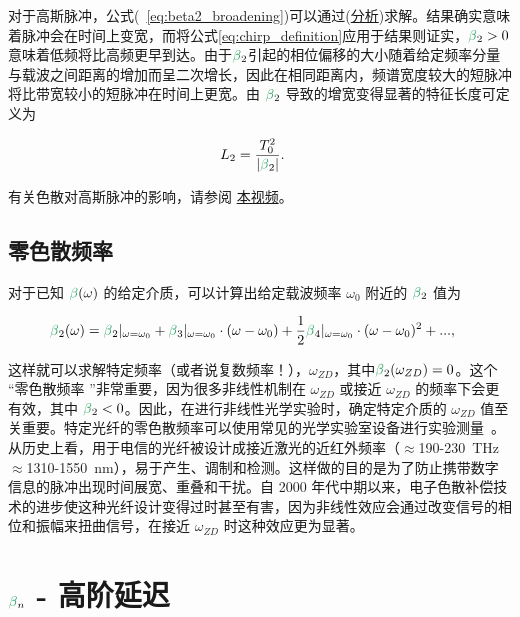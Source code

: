对于高斯脉冲，公式(~\ref{eq:beta2_broadening})可以通过(\href{https://drive.google.com/file/d/17Ab3bg0Hx0x8J-5lR29ejFg0eOlv6Psh/view?usp=sharing}{分析})求解。结果确实意味着脉冲会在时间上变宽，而将公式\ref{eq:chirp_definition}应用于结果则证实，$\betag_2>0$ 意味着低频将比高频更早到达。由于$\betag_2$引起的相位偏移的大小随着给定频率分量与载波之间距离的增加而呈二次增长，因此在相同距离内，频谱宽度较大的短脉冲将比带宽较小的短脉冲在时间上更宽。由 $\betag_2$ 导致的增宽变得显著的特征长度可定义为

\begin{align}
    \label{eq:Dispersion_length}
    L_{2} &= \frac{T_0^2}{|\betag_2|}.
\end{align}

有关色散对高斯脉冲的影响，请参阅 \href{https://www.youtube.com/watch?v=BP6Ra98AEuU}{本视频}。

\subsection{零色散频率}
\label{subsec:ZDF}

对于已知 $\betag(\omega)$ 的给定介质，可以计算出给定载波频率 $\omega_0$ 附近的 $\betag_2$ 值为

\begin{align}
\label{eq:ZDF}
    \betag_2(\omega) &= \betag_2|_{\omega=\omega_0} + \betag_3|_{\omega=\omega_0}\cdot(\omega-\omega_0)+\frac{1}{2}\betag_4|_{\omega=\omega_0}\cdot(\omega-\omega_0)^2 +...,
\end{align}

这样就可以求解特定频率（或者说复数频率！），$\omega_{ZD}$，其中$\betag_2(\omega_{ZD})=0$。这个 “零色散频率 ”非常重要，因为很多非线性机制在 $\omega_{ZD}$ 或接近 $\omega_{ZD}$ 的频率下会更有效，其中 $\betag_2<0$。因此，在进行非线性光学实验时，确定特定介质的 $\omega_{ZD}$ 值至关重要。特定光纤的零色散频率可以使用常见的光学实验室设备进行实验测量~\cite{zero_disp_measurement}。
从历史上看，用于电信的光纤被设计成接近激光的近红外频率（$\approx$190-230~THz $\approx$1310-1550~nm），易于产生、调制和检测。这样做的目的是为了防止携带数字信息的脉冲出现时间展宽、重叠和干扰。自 2000 年代中期以来，电子色散补偿技术的进步使这种光纤设计变得过时甚至有害，因为非线性效应会通过改变信号的相位和振幅来扭曲信号，在接近 $\omega_{ZD}$ 时这种效应更为显著。

\section{$\betag_n$ - 高阶延迟}

